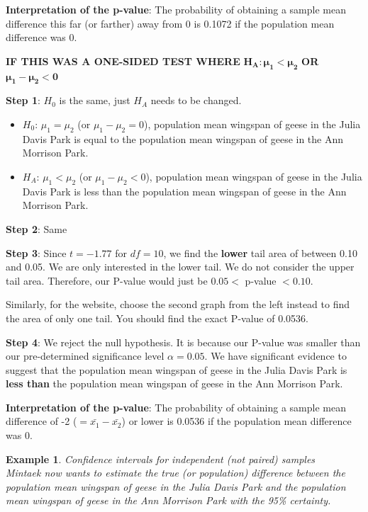 \documentclass[12pt]{article}
\newcounter{lecnum}
\newtheorem{example}{Example}[lecnum]
\begin{document}
\noindent \textbf{Interpretation of the p-value}: The probability of obtaining a sample mean difference this far (or farther) away from 0 is 0.1072 if the population mean difference was 0.

\vspace{10 pt}

\textbf{IF THIS WAS A ONE-SIDED TEST WHERE} $\mathbf{H_A: \boldsymbol\mu_1 < \boldsymbol\mu_2}$ \textbf{ OR } $\mathbf{\boldsymbol\mu_1 - \boldsymbol\mu_2 < 0}$

\vspace{10 pt}

\noindent \textbf{Step 1}: $H_0$ is the same, just $H_A$ needs to be changed.
\begin{itemize}
	\item $H_0$: $\mu_1 = \mu_2$ (or $\mu_1 - \mu_2 = 0$), population mean wingspan of geese in the Julia Davis Park is equal to the population mean wingspan of geese in the Ann Morrison Park.
	\item $H_A$: $\mu_1 < \mu_2$ (or $\mu_1 - \mu_2 < 0$), population mean wingspan of geese in the Julia Davis Park is less than the population mean wingspan of geese in the Ann Morrison Park.
\end{itemize}

\noindent \textbf{Step 2}: Same

\noindent \textbf{Step 3}: Since $t = -1.77$ for $df = 10$, we find the \textbf{lower} tail area of between 0.10 and 0.05. We are only interested in the lower tail. We do not consider the upper tail area. Therefore, our P-value would just be $0.05 <$ p-value $< 0.10$.

Similarly, for the website, choose the second graph from the left instead to find the area of only one tail. You should find the exact P-value of 0.0536.

\noindent \textbf{Step 4}: We reject the null hypothesis. It is because our P-value was smaller than our pre-determined significance level $\alpha = 0.05$. We have significant evidence to suggest that the population mean wingspan of geese in the Julia Davis Park is \textbf{less than} the population mean wingspan of geese in the Ann Morrison Park.

\noindent \textbf{Interpretation of the p-value}: The probability of obtaining a sample mean difference of -2 ($= \bar{x_1} - \bar{x_2}$) or lower is 0.0536 if the population mean difference was 0. 

\pagebreak

\begin{example} Confidence intervals for independent (not paired) samples \\
	Mintaek now wants to estimate the true (or population) difference between the population mean wingspan of geese in the Julia Davis Park and the population mean wingspan of geese in the Ann Morrison Park with the 95\% certainty.
\end{example}
\end{document}
